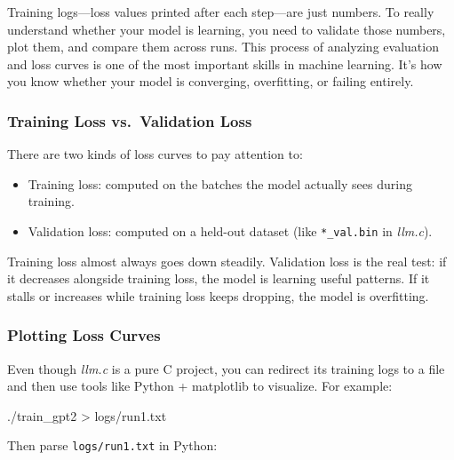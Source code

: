 \documentclass[
  letterpaper,
  DIV=11,
  numbers=noendperiod]{scrreprt}
\newenvironment{Shaded}{\begin{snugshade}}{\end{snugshade}}
\newcommand{\ExtensionTok}[1]{\textcolor[rgb]{0.00,0.23,0.31}{#1}}
\newcommand{\NormalTok}[1]{\textcolor[rgb]{0.00,0.23,0.31}{#1}}
\newcommand{\OperatorTok}[1]{\textcolor[rgb]{0.37,0.37,0.37}{#1}}
\providecommand{\tightlist}{%
  \setlength{\itemsep}{0pt}\setlength{\parskip}{0pt}}
\begin{document}
Training logs---loss values printed after each step---are just numbers.
To really understand whether your model is learning, you need to
validate those numbers, plot them, and compare them across runs. This
process of analyzing evaluation and loss curves is one of the most
important skills in machine learning. It's how you know whether your
model is converging, overfitting, or failing entirely.

\subsubsection{Training Loss vs.~Validation
Loss}\label{training-loss-vs.-validation-loss}

There are two kinds of loss curves to pay attention to:

\begin{itemize}
\tightlist
\item
  Training loss: computed on the batches the model actually sees during
  training.
\item
  Validation loss: computed on a held-out dataset (like
  \texttt{*\_val.bin} in \emph{llm.c}).
\end{itemize}

Training loss almost always goes down steadily. Validation loss is the
real test: if it decreases alongside training loss, the model is
learning useful patterns. If it stalls or increases while training loss
keeps dropping, the model is overfitting.

\subsubsection{Plotting Loss Curves}\label{plotting-loss-curves}

Even though \emph{llm.c} is a pure C project, you can redirect its
training logs to a file and then use tools like Python + matplotlib to
visualize. For example:

\begin{Shaded}
\begin{Highlighting}[]
\ExtensionTok{./train\_gpt2} \OperatorTok{\textgreater{}}\NormalTok{ logs/run1.txt}
\end{Highlighting}
\end{Shaded}

Then parse \texttt{logs/run1.txt} in Python:
\end{document}

